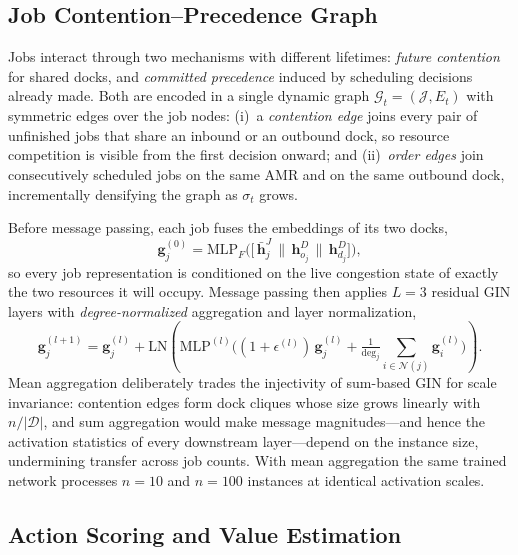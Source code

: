 \subsection{Job Contention--Precedence Graph}
\label{sec:graph}

Jobs interact through two mechanisms with different lifetimes:
\emph{future contention} for shared docks, and \emph{committed
precedence} induced by scheduling decisions already made. Both are
encoded in a single dynamic graph $\mathcal{G}_t=(\mathcal{J},E_t)$
with symmetric edges over the job nodes:
(i)~a \emph{contention edge} joins every pair of unfinished jobs that
share an inbound or an outbound dock, so resource competition is
visible from the first decision onward; and
(ii)~\emph{order edges} join consecutively scheduled jobs on the same
AMR and on the same outbound dock, incrementally densifying the graph
as $\sigma_t$ grows.

Before message passing, each job fuses the embeddings of its two docks,
\begin{equation}
\bm{g}^{(0)}_j=\mathrm{MLP}_{F}\!\big(\big[\,\bar{\bm{h}}^{J}_j \,\|\,
\bm{h}^{D}_{o_j} \,\|\, \bm{h}^{D}_{d_j}\big]\big),
\label{eq:fusion}
\end{equation}
so every job representation is conditioned on the live congestion state
of exactly the two resources it will occupy. Message passing then
applies $L=3$ residual GIN layers with \emph{degree-normalized}
aggregation and layer normalization,
\begin{equation}
\bm{g}^{(l+1)}_j=\bm{g}^{(l)}_j+
\mathrm{LN}\!\left(\mathrm{MLP}^{(l)}\!\Big(
(1{+}\epsilon^{(l)})\,\bm{g}^{(l)}_j+
\tfrac{1}{\deg_j}\!\!\sum_{i\in\mathcal{N}(j)}\!\bm{g}^{(l)}_i
\Big)\right)\!.
\label{eq:gin}
\end{equation}
Mean aggregation deliberately trades the injectivity of sum-based GIN
\cite{xu2019gin} for scale invariance: contention edges form dock
cliques whose size grows linearly with $n/|\mathcal{D}|$, and
sum aggregation would make message magnitudes---and hence the
activation statistics of every downstream layer---depend on the
instance size, undermining transfer across job counts. With mean
aggregation the same trained network processes $n{=}10$ and $n{=}100$
instances at identical activation scales.

\subsection{Action Scoring and Value Estimation}
\label{sec:actor}

